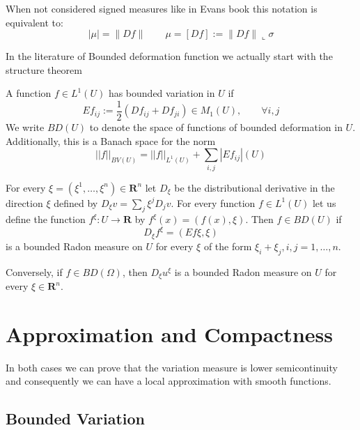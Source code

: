 \begin{remark}
When not considered signed measures like in Evans book this notation is equivalent to:
$$|\mu|=\|Df\|\qquad \mu = [D f]:=\|D f\|\llcorner\sigma$$
\end{remark}

In the literature of Bounded deformation function we actually start with the structure theorem 




\begin{definition}
A function $f \in L^1(U)$ has bounded variation in $U$ if $$Ef_{ij}:=\frac{1}{2}(Df_{ij}+Df_{ji})\in M_1(U), \qquad \forall i,j $$
We write
$B D(U)$
to denote the space of functions of bounded deformation in $U$. 
Additionally, this is a Banach space for the norm
$$||f||_{BV(U)} = ||f||_{L^1(U)}+\sum_{i,j}|Ef_{ij}|(U)$$
\end{definition}
\begin{definition}
For every $\xi=\left(\xi^1, \ldots, \xi^n\right) \in \mathbf{R}^n$ let $D_{\xi}$ be the distributional derivative in the direction $\xi$ defined by $D_{\xi} v=\sum_j \xi^j D_j v$. For every function $f\in L^1(U)$ let us define the function $f^{\xi}: U \rightarrow \mathbf{R}$ by $f^{\xi}(x)=(f(x), \xi)$. Then $f \in B D(U)$ if 
$$
D_{\xi} f^{\xi}=(E f \xi, \xi)
$$
 is a bounded Radon measure on $U$ for every $\xi$ of the form $\xi_i+\xi_j, i, j=1, \ldots, n$.
 
Conversely, if $f \in B D(\Omega)$, then $D_{\xi} u^{\xi}$ is a bounded Radon measure on $U$ for every $\xi \in \mathbf{R}^n$.
\end{definition}


\section{Approximation and Compactness}

In both cases we can prove that the variation measure is lower semicontinuity and consequently we can have a local approximation with smooth functions.


\subsection{Bounded Variation}

